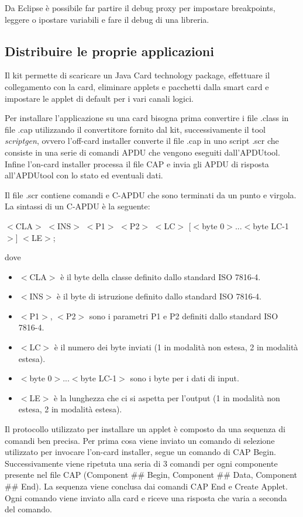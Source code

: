 Da Eclipse è possibile far partire il debug proxy per impostare breakpoints, leggere o ipostare variabili e fare il debug di una libreria.

\subsection{Distribuire le proprie applicazioni}
Il kit permette di scaricare un Java Card technology package, effettuare il collegamento con la card, eliminare applets e pacchetti dalla smart card e impostare le applet di default per i vari canali logici.

Per installare l'applicazione su una card bisogna prima convertire i file .class in file .cap utilizzando il convertitore fornito dal kit, successivamente il tool \textit{scriptgen}, ovvero l'off-card installer converte il file .cap in uno script .scr che consiste in una serie di comandi APDU che vengono eseguiti dall'APDUtool. Infine l'on-card installer processa il file CAP e invia gli APDU di risposta all'APDUtool con lo stato ed eventuali dati.

Il file .scr contiene comandi e C-APDU che sono terminati da un punto e virgola.
La sintassi di un C-APDU è la seguente:
\begin{center}
    $<$CLA$>$ $<$INS$>$ $<$P1$>$ $<$P2$>$ $<$LC$>$ [$<$byte 0$>$...$<$byte LC-1$>$] $<$LE$>$;
\end{center}
dove
\begin{itemize}
    \item $<$CLA$>$ è il byte della classe definito dallo standard ISO 7816-4.
    \item $<$INS$>$ è il byte di istruzione definito dallo standard ISO 7816-4.
    \item $<$P1$>$, $<$P2$>$ sono i parametri P1 e P2 definiti dallo standard ISO 7816-4.
    \item $<$LC$>$ è il numero dei byte inviati (1 in modalità non estesa, 2 in modalità estesa).
    \item $<$byte 0$>$...$<$byte LC-1$>$ sono i byte per i dati di input.
    \item $<$LE$>$ è la lunghezza che ci si aspetta per l'output (1 in modalità non estesa, 2 in modalità estesa).
\end{itemize}

Il protocollo utilizzato per installare un applet è composto da una sequenza di comandi ben precisa. Per prima cosa viene inviato un comando di selezione utilizzato per invocare l'on-card installer, segue un comando di CAP Begin. Successivamente viene ripetuta una seria di 3 comandi per ogni componente presente nel file CAP (Component \#\# Begin, Component \#\# Data, Component \#\# End). La sequenza viene conclusa dai comandi CAP End e Create Applet. Ogni comando viene inviato alla card e riceve una risposta che varia a seconda del comando.

